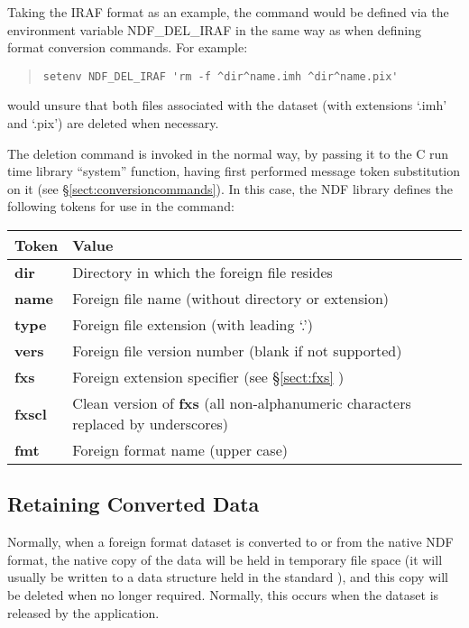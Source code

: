 Taking the IRAF format as an example, the command would be defined via
the environment variable NDF\_DEL\_IRAF in the same way as when
defining format conversion commands. For example:

\begin{quote}
\begin{small}
\begin{verbatim}
setenv NDF_DEL_IRAF 'rm -f ^dir^name.imh ^dir^name.pix'
\end{verbatim}
\end{small}
\end{quote}

would unsure that both files associated with the dataset (with
extensions `.imh' and `.pix') are deleted when necessary.

The deletion command is invoked in the normal way, by passing it to
the C run time library ``system'' function, having first performed
message token substitution on it (see
\S\ref{sect:conversioncommands}). In this case, the NDF library
defines the following tokens for use in the command:

\begin{center}
\begin{tabular}{|l|l|}
\hline
{\bf Token} & {\bf Value}\\
\hline\hline
{\bf dir}  & Directory in which the foreign file resides\\
{\bf name} & Foreign file name (without directory or extension)\\
{\bf type} & Foreign file extension (with leading `.')\\
{\bf vers} & Foreign file version number (blank if not supported)\\
{\bf fxs}  & Foreign extension specifier (see \S\ref{sect:fxs} )\\
{\bf fxscl} & Clean version of {\bf fxs} (all non-alphanumeric characters
replaced by underscores)\\
{\bf fmt}  & Foreign format name (upper case)\\
\hline
\end{tabular}
\end{center}

\subsection{\label{sect:keep}Retaining Converted Data}

Normally, when a foreign format dataset is converted to or from the
native NDF format, the native copy of the data will be held in
temporary file space (it will usually be written to a data structure
held in the standard  ), and this copy will be deleted when no
longer required. Normally, this occurs when the dataset is released by
the application.

